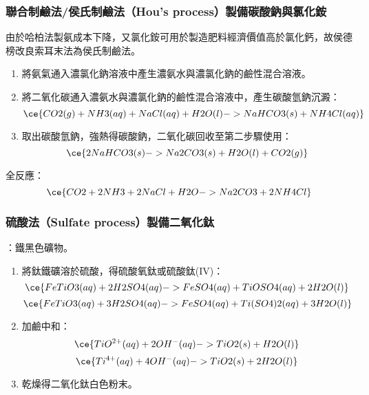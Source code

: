 \documentclass[a4paper,12pt]{report}
\begin{document}
\begin{itemize}
\subsubsection{聯合制鹼法/侯氏制鹼法（Hou's process）製備碳酸鈉與氯化銨}
由於哈柏法製氨成本下降，又氯化銨可用於製造肥料經濟價值高於氯化鈣，故侯德榜改良索耳末法為侯氏制鹼法。
\begin{enumerate}
\item 將氨氣通入濃氯化鈉溶液中產生濃氨水與濃氯化鈉的鹼性混合溶液。
\item 將二氧化碳通入濃氨水與濃氯化鈉的鹼性混合溶液中，產生碳酸氫鈉沉澱：
\[\ce{CO2(g) + NH3(aq) + NaCl(aq) + H2O(l) -> NaHCO3(s) + NH4Cl(aq)}\]
\item 取出碳酸氫鈉，強熱得碳酸鈉，二氧化碳回收至第二步驟使用：
\[\ce{2NaHCO3(s) -> Na2CO3(s) + H2O(l) + CO2(g)}\]
\end{enumerate}
全反應：
\[\ce{CO2 + 2NH3 + 2NaCl + H2O -> Na2CO3 + 2NH4Cl}\]
\subsubsection{硫酸法（Sulfate process）製備二氧化鈦}
：鐵黑色礦物。
\begin{enumerate}
\item 將鈦鐵礦溶於硫酸，得硫酸氧鈦或硫酸鈦(IV)：
\[\ce{FeTiO3(aq) + 2H2SO4(aq) -> FeSO4(aq) + TiOSO4(aq) + 2H2O(l)}\]
\[\ce{FeTiO3(aq) + 3H2SO4(aq) -> FeSO4(aq) + Ti(SO4)2(aq) + 3H2O(l)}\]
\item 加鹼中和：
\[\ce{TiO^{2+}(aq) + 2OH^-(aq) -> TiO2(s) + H2O(l)}\]
\[\ce{Ti^{4+}(aq) + 4OH^-(aq) -> TiO2(s) + 2H2O(l)}\]
\item 乾燥得二氧化鈦白色粉末。
\end{enumerate}

\end{itemize}
\end{document}
